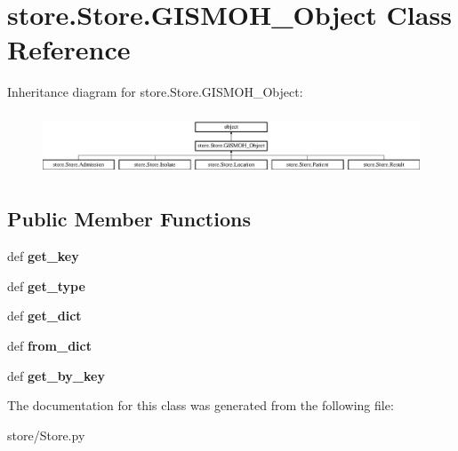 \hypertarget{classstore_1_1_store_1_1_g_i_s_m_o_h___object}{\section{store.\-Store.\-G\-I\-S\-M\-O\-H\-\_\-\-Object Class Reference}
\label{classstore_1_1_store_1_1_g_i_s_m_o_h___object}
}
Inheritance diagram for store.\-Store.\-G\-I\-S\-M\-O\-H\-\_\-\-Object\-:\begin{figure}[H]
\begin{center}
\leavevmode
\includegraphics[height=1.866667cm]{classstore_1_1_store_1_1_g_i_s_m_o_h___object}
\end{center}
\end{figure}
\subsection*{Public Member Functions}
\begin{DoxyCompactItemize}
\item 
\hypertarget{classstore_1_1_store_1_1_g_i_s_m_o_h___object_ac3391d8ff49f41c4d90d8692fcf9ee8e}{def {\bfseries get\-\_\-key}}\label{classstore_1_1_store_1_1_g_i_s_m_o_h___object_ac3391d8ff49f41c4d90d8692fcf9ee8e}

\item 
\hypertarget{classstore_1_1_store_1_1_g_i_s_m_o_h___object_ab955e952f3fad2c1cc1909cf79bbfd25}{def {\bfseries get\-\_\-type}}\label{classstore_1_1_store_1_1_g_i_s_m_o_h___object_ab955e952f3fad2c1cc1909cf79bbfd25}

\item 
\hypertarget{classstore_1_1_store_1_1_g_i_s_m_o_h___object_a9b9e18740c48aedb2751ffbe62ca5f50}{def {\bfseries get\-\_\-dict}}\label{classstore_1_1_store_1_1_g_i_s_m_o_h___object_a9b9e18740c48aedb2751ffbe62ca5f50}

\item 
\hypertarget{classstore_1_1_store_1_1_g_i_s_m_o_h___object_a2e3683c267f623cd7740c7f47da42880}{def {\bfseries from\-\_\-dict}}\label{classstore_1_1_store_1_1_g_i_s_m_o_h___object_a2e3683c267f623cd7740c7f47da42880}

\item 
\hypertarget{classstore_1_1_store_1_1_g_i_s_m_o_h___object_a539e1c749f7900003ac845ec1f40c13d}{def {\bfseries get\-\_\-by\-\_\-key}}\label{classstore_1_1_store_1_1_g_i_s_m_o_h___object_a539e1c749f7900003ac845ec1f40c13d}

\end{DoxyCompactItemize}


The documentation for this class was generated from the following file\-:\begin{DoxyCompactItemize}
\item 
store/Store.\-py\end{DoxyCompactItemize}
